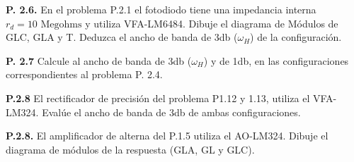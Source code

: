 \noindent \textbf{P. 2.6.} En el problema P.2.1 el fotodiodo tiene una impedancia interna $r_d = 10 \text{ Megohms}$ y utiliza VFA-LM6484. Dibuje el diagrama de Módulos de GLC, GLA y T. Deduzca el ancho de banda de 3db ($\omega_H$) de la configuración.

\noindent \textbf{P. 2.7} Calcule al ancho de banda de 3db ($\omega_H$) y de 1db, en las configuraciones correspondientes al problema P. 2.4.

\noindent \textbf{P.2.8} El rectificador de precisión del problema P1.12 y 1.13, utiliza el VFA-LM324. Evalúe el ancho de banda de 3db de ambas configuraciones.

\noindent \textbf{P.2.8.} El amplificador de alterna del P.1.5 utiliza el AO-LM324. Dibuje el diagrama de módulos de la respuesta (GLA, GL y GLC).